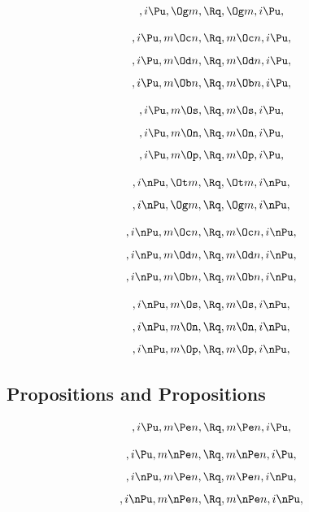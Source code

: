 \[, i \Pu, \Og m, \Rq , \Og m, i \Pu,\]

\[, i \Pu, m \Oc n, \Rq , m \Oc n, i \Pu,\]
\[, i \Pu, m \Od n, \Rq , m \Od n, i \Pu,\]
\[, i \Pu, m \Ob n, \Rq , m \Ob n, i \Pu,\]

\[, i \Pu, m \Os, \Rq , m \Os, i \Pu,\]
\[, i \Pu, m \On, \Rq , m \On, i \Pu,\]
\[, i \Pu, m \Op, \Rq , m \Op, i \Pu,\]

\bigskip
\bigskip
\[, i \nPu, \Ot m, \Rq , \Ot m, i \nPu,\]
\[, i \nPu, \Og m, \Rq , \Og m, i \nPu,\]

\[, i \nPu, m \Oc n, \Rq , m \Oc n, i \nPu,\]
\[, i \nPu, m \Od n, \Rq , m \Od n, i \nPu,\]
\[, i \nPu, m \Ob n, \Rq , m \Ob n, i \nPu,\]

\[, i \nPu, m \Os, \Rq , m \Os, i \nPu,\]
\[, i \nPu, m \On, \Rq , m \On, i \nPu,\]
\[, i \nPu, m \Op, \Rq , m \Op, i \nPu,\]



\bigskip
\bigskip
\bigskip
\bigskip
\subsection{Propositions and Propositions}
\[,i \Pu, m \Pe n, \Rq , m \Pe n, i \Pu,\]



\[,i \Pu, m \nPe n, \Rq , m \nPe n, i \Pu,\]
\[,i \nPu, m \Pe n, \Rq , m \Pe n, i \nPu,\]
\[,i \nPu, m \nPe n, \Rq , m \nPe n, i \nPu,\]

